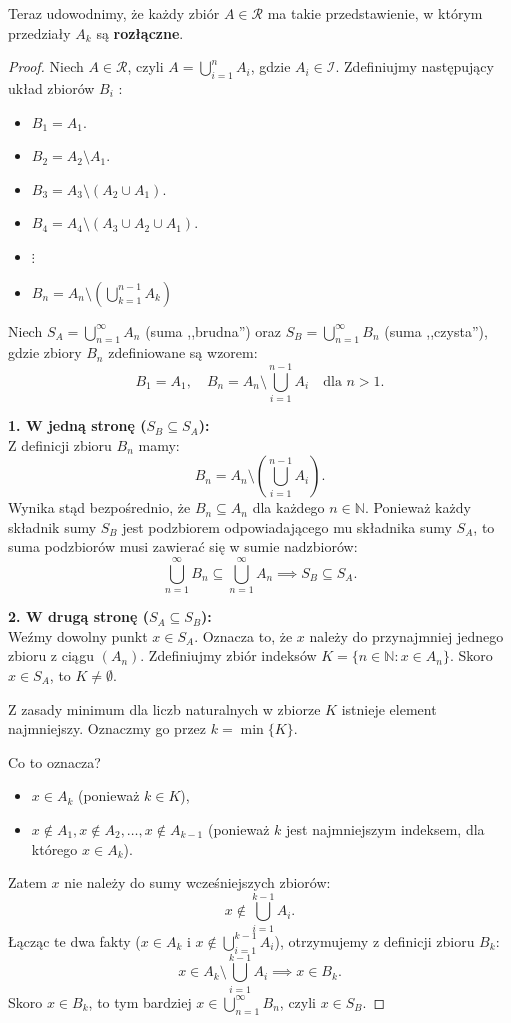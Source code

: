 \noindent Teraz udowodnimy, że każdy zbiór $A\in \mathcal{R}$ ma takie przedstawienie, w którym przedziały $A_{k}$ są \textbf{rozłączne}.
\begin{proof}
	Niech $A\in \mathcal{R}$, czyli $A = \bigcup_{i=1} ^{n}A_{i}$, gdzie $A_{i} \in  \mathcal{I}$.
	Zdefiniujmy następujący układ zbiorów $B_{i}$ :
	\begin{itemize}
		\item $B_1 = A_1$.
		\item $B_2 = A_2 \setminus A_1$.
		\item $B_3 = A_3\setminus \left( A_2 \cup A_1 \right) $.
		\item $B_4 = A_4\setminus \left( A_3\cup A_2 \cup A_1 \right) $.
		\item $\vdots$
		\item  $B_{n} = A_{n}\setminus \left( \bigcup_{k=1} ^{n-1}A_{k} \right) $
	\end{itemize}

    Niech $S_A = \bigcup_{n=1}^{\infty} A_n$ (suma ,,brudna'') oraz $S_B = \bigcup_{n=1}^{\infty} B_n$ (suma ,,czysta''), gdzie zbiory $B_n$ zdefiniowane są wzorem:
    \[
        B_1 = A_1, \quad B_n = A_n \setminus \bigcup_{i=1}^{n-1} A_i \quad \text{dla } n > 1.
    \]

    \noindent\textbf{1. W jedną stronę ($S_B \subseteq S_A$):} \\
    Z definicji zbioru $B_n$ mamy:
    \[
        B_n = A_n \setminus \left( \bigcup_{i=1}^{n-1} A_i \right).
    \]
    Wynika stąd bezpośrednio, że $B_n \subseteq A_n$ dla każdego $n \in \mathbb{N}$.
    Ponieważ każdy składnik sumy $S_B$ jest podzbiorem odpowiadającego mu składnika sumy $S_A$, to suma podzbiorów musi zawierać się w sumie nadzbiorów:
    \[
        \bigcup_{n=1}^{\infty} B_n \subseteq \bigcup_{n=1}^{\infty} A_n \implies S_B \subseteq S_A.
    \]

    \noindent\textbf{2. W drugą stronę ($S_A \subseteq S_B$):} \\
    Weźmy dowolny punkt $x \in S_A$. Oznacza to, że $x$ należy do przynajmniej jednego zbioru z ciągu $(A_n)$.
    Zdefiniujmy zbiór indeksów $K = \{ n \in \mathbb{N} : x \in A_n \}$. Skoro $x \in S_A$, to $K \neq \emptyset$.
    
    Z zasady minimum dla liczb naturalnych w zbiorze $K$ istnieje element najmniejszy. Oznaczmy go przez $k = \min\{K\} $.
    
    Co to oznacza?
    \begin{itemize}
        \item $x \in A_k$ (ponieważ $k \in K$),
        \item $x \notin A_1, x \notin A_2, \dots, x \notin A_{k-1}$ (ponieważ $k$ jest najmniejszym indeksem, dla którego $x \in A_k$).
    \end{itemize}
    Zatem $x$ nie należy do sumy wcześniejszych zbiorów:
    \[
        x \notin \bigcup_{i=1}^{k-1} A_i.
    \]
    Łącząc te dwa fakty ($x \in A_k$ i $x \notin \bigcup_{i=1}^{k-1} A_i$), otrzymujemy z definicji zbioru $B_k$:
    \[
        x \in A_k \setminus \bigcup_{i=1}^{k-1} A_i \implies x \in B_k.
    \]
    Skoro $x \in B_k$, to tym bardziej $x \in \bigcup_{n=1}^{\infty} B_n$, czyli $x \in S_B$.
    

\end{proof}
